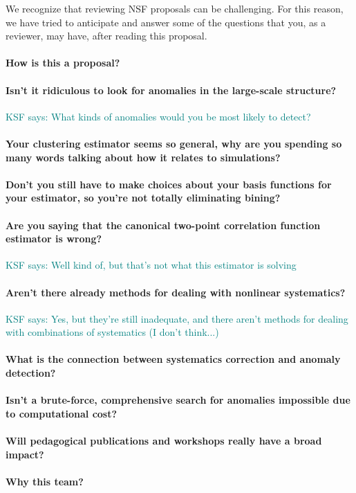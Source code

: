 \documentclass[12pt, fullpage, letterpaper]{article}
\newcommand{\KSF}[1]{\textcolor{teal}{KSF says: #1}}
\begin{document}
We recognize that reviewing NSF proposals can be challenging.
For this reason, we have tried to anticipate and answer some of the
questions that you, as a reviewer, may have, after reading this
proposal.

\paragraph{How is this a  proposal?}

\paragraph{Isn't it ridiculous to look for anomalies in the large-scale structure?} \KSF{What kinds of anomalies would you be most likely to detect?}

\paragraph{Your clustering estimator seems so general, why are you spending so many words talking about how it relates to simulations?}

\paragraph{Don't you still have to make choices about your basis functions for your estimator, so you're not totally eliminating bining?}

\paragraph{Are you saying that the canonical two-point correlation function estimator is wrong?} \KSF{Well kind of, but that's not what this estimator is solving}

\paragraph{Aren't there already methods for dealing with nonlinear systematics?} \KSF{Yes, but they're still inadequate, and there aren't methods for dealing with combinations of systematics (I don't think...)}

\paragraph{What is the connection between systematics correction and anomaly detection?}

\paragraph{Isn't a brute-force, comprehensive search for \LSS anomalies impossible due to computational cost?}

\paragraph{Will pedagogical publications and workshops really have a broad impact?}

\paragraph{Why this team?}



\end{document}
